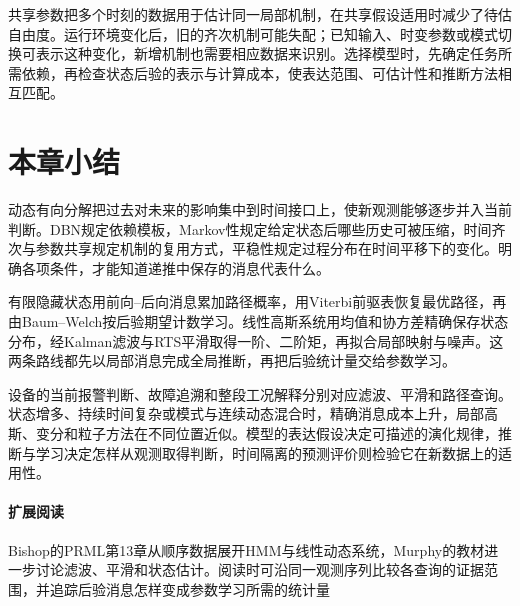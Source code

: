 共享参数把多个时刻的数据用于估计同一局部机制，在共享假设适用时减少了待估自由度。运行环境变化后，旧的齐次机制可能失配；已知输入、时变参数或模式切换可表示这种变化，新增机制也需要相应数据来识别。选择模型时，先确定任务所需依赖，再检查状态后验的表示与计算成本，使表达范围、可估计性和推断方法相互匹配。

\section{本章小结}
\label{sec:pgm-dynamic-summary}

动态有向分解把过去对未来的影响集中到时间接口上，使新观测能够逐步并入当前判断。DBN规定依赖模板，Markov性规定给定状态后哪些历史可被压缩，时间齐次与参数共享规定机制的复用方式，平稳性规定过程分布在时间平移下的变化。明确各项条件，才能知道递推中保存的消息代表什么。

有限隐藏状态用前向--后向消息累加路径概率，用Viterbi前驱表恢复最优路径，再由Baum--Welch按后验期望计数学习。线性高斯系统用均值和协方差精确保存状态分布，经Kalman滤波与RTS平滑取得一阶、二阶矩，再拟合局部映射与噪声。这两条路线都先以局部消息完成全局推断，再把后验统计量交给参数学习。

设备的当前报警判断、故障追溯和整段工况解释分别对应滤波、平滑和路径查询。状态增多、持续时间复杂或模式与连续动态混合时，精确消息成本上升，局部高斯、变分和粒子方法在不同位置近似。模型的表达假设决定可描述的演化规律，推断与学习决定怎样从观测取得判断，时间隔离的预测评价则检验它在新数据上的适用性。

\paragraph{扩展阅读}
Bishop的PRML第13章从顺序数据展开HMM与线性动态系统，Murphy的教材进一步讨论滤波、平滑和状态估计。阅读时可沿同一观测序列比较各查询的证据范围，并追踪后验消息怎样变成参数学习所需的统计量
